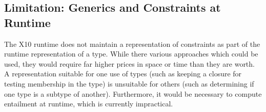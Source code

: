 \subsection{Limitation: Generics and Constraints at Runtime}
\label{sect:RuntimeConstraintErasure}


The X10 runtime does not maintain a representation of constraints as part of
the runtime representation of a type.  While there various approaches which
could be used,  they would require far higher prices in space or time than
they are worth.  A representation suitable for one use of types
(such as keeping a closure for testing membership in the type) is unsuitable
for others (such as determining if one type is a subtype of another).
Furthermore, it would be necessary to compute entailment at runtime, which is
currently impractical.  













